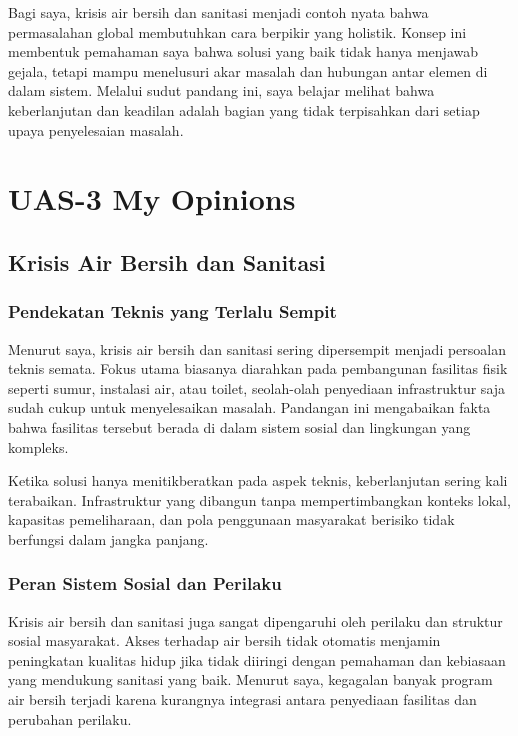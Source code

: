 \documentclass[
  letterpaper,
  DIV=11,
  numbers=noendperiod]{scrreprt}
\begin{document}
Bagi saya, krisis air bersih dan sanitasi menjadi contoh nyata bahwa
permasalahan global membutuhkan cara berpikir yang holistik. Konsep ini
membentuk pemahaman saya bahwa solusi yang baik tidak hanya menjawab
gejala, tetapi mampu menelusuri akar masalah dan hubungan antar elemen
di dalam sistem. Melalui sudut pandang ini, saya belajar melihat bahwa
keberlanjutan dan keadilan adalah bagian yang tidak terpisahkan dari
setiap upaya penyelesaian masalah.


\chapter{UAS-3 My Opinions}\label{uas-3-my-opinions}

\section{Krisis Air Bersih dan
Sanitasi}\label{krisis-air-bersih-dan-sanitasi-1}

\subsection{Pendekatan Teknis yang Terlalu
Sempit}\label{pendekatan-teknis-yang-terlalu-sempit}

Menurut saya, krisis air bersih dan sanitasi sering dipersempit menjadi
persoalan teknis semata. Fokus utama biasanya diarahkan pada pembangunan
fasilitas fisik seperti sumur, instalasi air, atau toilet, seolah-olah
penyediaan infrastruktur saja sudah cukup untuk menyelesaikan masalah.
Pandangan ini mengabaikan fakta bahwa fasilitas tersebut berada di dalam
sistem sosial dan lingkungan yang kompleks.

Ketika solusi hanya menitikberatkan pada aspek teknis, keberlanjutan
sering kali terabaikan. Infrastruktur yang dibangun tanpa
mempertimbangkan konteks lokal, kapasitas pemeliharaan, dan pola
penggunaan masyarakat berisiko tidak berfungsi dalam jangka panjang.

\subsection{Peran Sistem Sosial dan
Perilaku}\label{peran-sistem-sosial-dan-perilaku}

Krisis air bersih dan sanitasi juga sangat dipengaruhi oleh perilaku dan
struktur sosial masyarakat. Akses terhadap air bersih tidak otomatis
menjamin peningkatan kualitas hidup jika tidak diiringi dengan pemahaman
dan kebiasaan yang mendukung sanitasi yang baik. Menurut saya, kegagalan
banyak program air bersih terjadi karena kurangnya integrasi antara
penyediaan fasilitas dan perubahan perilaku.
\end{document}
